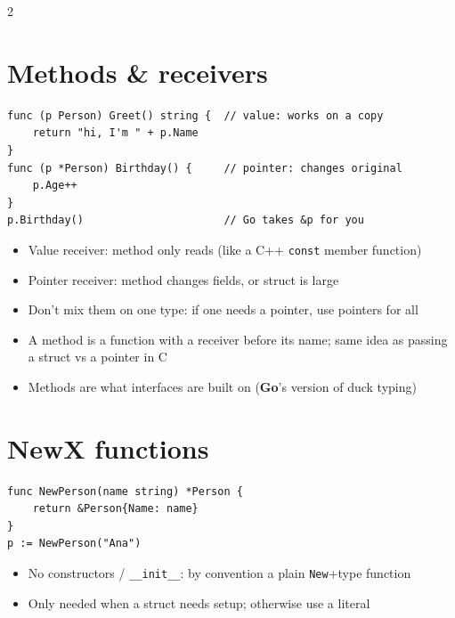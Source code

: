\documentclass[9pt]{extarticle}
\newcommand{\Go}{\textbf{\textcolor{goblue}{Go}}}
\newcommand{\kw}[1]{\textcolor{accent}{\texttt{#1}}}
\begin{document}
\begin{multicols*}{2}
\section{Methods \& receivers}
\begin{lstlisting}
func (p Person) Greet() string {  // value: works on a copy
    return "hi, I'm " + p.Name
}
func (p *Person) Birthday() {     // pointer: changes original
    p.Age++
}
p.Birthday()                      // Go takes &p for you
\end{lstlisting}
\begin{itemize}
  \item Value receiver: method only reads (like a C++ \kw{const} member function)
  \item Pointer receiver: method changes fields, or struct is large
  \item Don't mix them on one type: if one needs a pointer, use pointers for all
  \item A method is a function with a receiver before its name; same idea as passing a struct vs a pointer in C
  \item Methods are what interfaces are built on (\Go's version of duck typing)
\end{itemize}

\section{NewX functions}
\begin{lstlisting}
func NewPerson(name string) *Person {
    return &Person{Name: name}
}
p := NewPerson("Ana")
\end{lstlisting}
\begin{itemize}
  \item No constructors / \kw{\_\_init\_\_}: by convention a plain \kw{New}+type function
  \item Only needed when a struct needs setup; otherwise use a literal
\end{itemize}

\end{multicols*}
\end{document}
